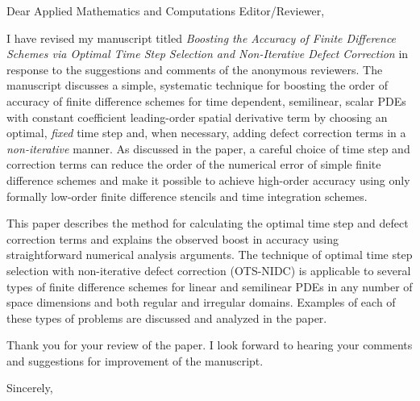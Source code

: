 \documentclass[12pt]{letter}
\begin{document}
\address{}
\signature{Kevin T. Chu}

\begin{letter}
{
}

\opening{Dear Applied Mathematics and Computations Editor/Reviewer,}

I have revised my manuscript titled \emph{Boosting the Accuracy of Finite
Difference Schemes via Optimal Time Step Selection and Non-Iterative Defect
Correction} in response to the suggestions and comments of the anonymous
reviewers.  The manuscript discusses a simple, systematic technique for
boosting the order of accuracy of finite difference schemes for time dependent,
semilinear, scalar PDEs with constant coefficient leading-order spatial
derivative term by choosing an optimal, \emph{fixed} time step and, when 
necessary, adding defect correction terms in a \emph{non-iterative} manner. 
As discussed in the paper, a careful choice of time step and correction terms
can reduce the order of the numerical error of simple finite difference
schemes and make it possible to achieve high-order accuracy using only
formally low-order finite difference stencils and time integration schemes.  

This paper describes the method for calculating the optimal time step and
defect correction terms and explains the observed boost in accuracy using 
straightforward numerical analysis arguments.  The technique of optimal time 
step selection with non-iterative defect correction (OTS-NIDC) is applicable
to several types of finite difference schemes for linear and semilinear PDEs
in any number of space dimensions and both regular and irregular domains.
Examples of each of these types of problems are discussed and analyzed in the
paper.

Thank you for your review of the paper.  I look forward to hearing your 
comments and suggestions for improvement of the manuscript.

\closing{Sincerely,}

\end{letter}
\end{document}
